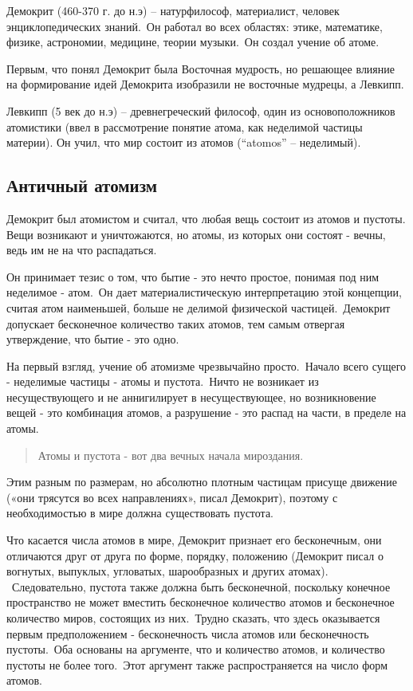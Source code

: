 \documentclass[
]{article}
\begin{document}
Демокрит (460-370 г. до н.э) -- натурфилософ, материалист, человек
энциклопедических знаний.~Он работал во всех областях: этике,
математике, физике, астрономии, медицине, теории музыки.~Он создал
учение об атоме.~

Первым, что понял Демокрит была Восточная мудрость, но решающее влияние
на формирование идей Демокрита изобразили не восточные мудрецы, а
Левкипп.

Левкипп (5 век до н.э) -- древнегреческий философ, один из
основоположников атомистики (ввел в рассмотрение понятие атома, как
неделимой частицы материи). Он учил, что мир состоит из атомов
(``atomos'' -- неделимый).

\hypertarget{ux430ux43dux442ux438ux447ux43dux44bux439-ux430ux442ux43eux43cux438ux437ux43c}{%
\subsection{Античный
атомизм}\label{ux430ux43dux442ux438ux447ux43dux44bux439-ux430ux442ux43eux43cux438ux437ux43c}}

Демокрит был атомистом и считал, что любая вещь состоит из атомов и
пустоты. Вещи возникают и уничтожаются, но атомы, из которых они состоят
- вечны, ведь им не на что распадаться.

Он принимает тезис о том, что бытие - это нечто простое, понимая под ним
неделимое - атом.~Он дает материалистическую интерпретацию этой
концепции, считая атом наименьшей, больше не делимой физической
частицей.~Демокрит допускает бесконечное количество таких атомов, тем
самым отвергая утверждение, что бытие - это одно.~

На первый взгляд, учение об атомизме чрезвычайно просто.~Начало всего
сущего - неделимые частицы - атомы и пустота.~Ничто не возникает из
несуществующего и не аннигилирует в несуществующее, но возникновение
вещей - это комбинация атомов, а разрушение - это распад на части, в
пределе на атомы.~

\begin{quote}
Атомы и пустота - вот два вечных начала мироздания.
\end{quote}

Этим разным по размерам, но абсолютно плотным частицам присуще движение
(«они трясутся во всех направлениях», писал Демокрит), поэтому с
необходимостью в мире должна существовать пустота.

Что касается числа атомов в мире, Демокрит признает его бесконечным, они
отличаются друг от друга по форме, порядку, положению (Демокрит писал о
вогнутых, выпуклых, угловатых, шарообразных и других атомах).
~Следовательно, пустота также должна быть бесконечной, поскольку
конечное пространство не может вместить бесконечное количество атомов и
бесконечное количество миров, состоящих из них.~Трудно сказать, что
здесь оказывается первым предположением - бесконечность числа атомов или
бесконечность пустоты.~Оба основаны на аргументе, что и количество
атомов, и количество пустоты не более того.~Этот аргумент также
распространяется на число форм атомов.
\end{document}

